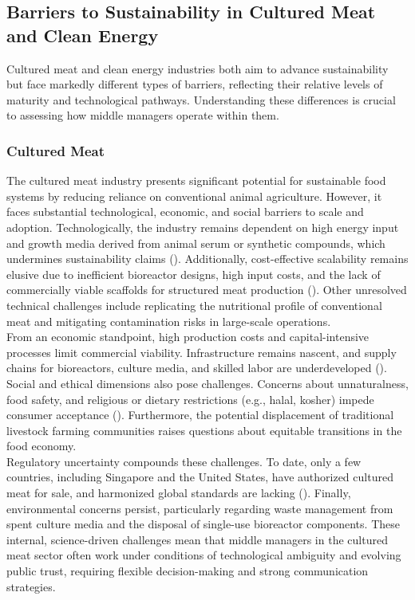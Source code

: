 	\subsection{Barriers to Sustainability in Cultured Meat and Clean Energy}
	Cultured meat and clean energy industries both aim to advance sustainability but face markedly different types of barriers, reflecting their relative levels of maturity and technological pathways. Understanding these differences is crucial to assessing how middle managers operate within them. \\
	
	\subsubsection{Cultured Meat}
	The cultured meat industry presents significant potential for sustainable food systems by reducing reliance on conventional animal agriculture. However, it faces substantial technological, economic, and social barriers to scale and adoption. Technologically, the industry remains dependent on high energy input and growth media derived from animal serum or synthetic compounds, which undermines sustainability claims (\textcite{Specht2023, Post2020}). Additionally, cost-effective scalability remains elusive due to inefficient bioreactor designs, high input costs, and the lack of commercially viable scaffolds for structured meat production (\textcite{Bodiou2020}). Other unresolved technical challenges include replicating the nutritional profile of conventional meat and mitigating contamination risks in large-scale operations. \\
	
	From an economic standpoint, high production costs and capital-intensive processes limit commercial viability. Infrastructure remains nascent, and supply chains for bioreactors, culture media, and skilled labor are underdeveloped (\textcite{Stephens2018}). Social and ethical dimensions also pose challenges. Concerns about unnaturalness, food safety, and religious or dietary restrictions (e.g., halal, kosher) impede consumer acceptance (\textcite{Bryant2020}). Furthermore, the potential displacement of traditional livestock farming communities raises questions about equitable transitions in the food economy. \\
	
	Regulatory uncertainty compounds these challenges. To date, only a few countries, including Singapore and the United States, have authorized cultured meat for sale, and harmonized global standards are lacking (\textcite{SFA2020, FDA2023}). Finally, environmental concerns persist, particularly regarding waste management from spent culture media and the disposal of single-use bioreactor components. These internal, science-driven challenges mean that middle managers in the cultured meat sector often work under conditions of technological ambiguity and evolving public trust, requiring flexible decision-making and strong communication strategies. \\
	
